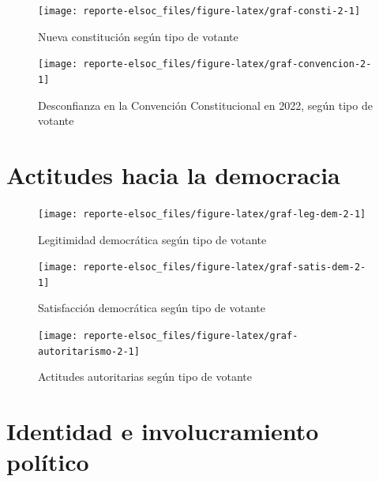 \documentclass[
  12pt,
]{book}
\begin{document}
\begin{figure}

{\centering \texttt{[image: reporte-elsoc\_files/figure-latex/graf-consti-2-1]} 

}

\caption{Nueva constitución según tipo de votante}\label{fig:graf-consti-2}
\end{figure}

\begin{figure}

{\centering \texttt{[image: reporte-elsoc\_files/figure-latex/graf-convencion-2-1]} 

}

\caption{Desconfianza en la Convención Constitucional en 2022, según tipo de votante}\label{fig:graf-convencion-2}
\end{figure}

\hypertarget{actitudes-hacia-la-democracia}{%
\section{Actitudes hacia la democracia}\label{actitudes-hacia-la-democracia}}

\begin{figure}

{\centering \texttt{[image: reporte-elsoc\_files/figure-latex/graf-leg-dem-2-1]} 

}

\caption{Legitimidad democrática según tipo de votante}\label{fig:graf-leg-dem-2}
\end{figure}

\begin{figure}

{\centering \texttt{[image: reporte-elsoc\_files/figure-latex/graf-satis-dem-2-1]} 

}

\caption{Satisfacción democrática según tipo de votante}\label{fig:graf-satis-dem-2}
\end{figure}

\begin{figure}

{\centering \texttt{[image: reporte-elsoc\_files/figure-latex/graf-autoritarismo-2-1]} 

}

\caption{Actitudes autoritarias según tipo de votante}\label{fig:graf-autoritarismo-2}
\end{figure}

\hypertarget{identidad-e-involucramiento-poluxedtico}{%
\section{Identidad e involucramiento político}\label{identidad-e-involucramiento-poluxedtico}}
\end{document}
